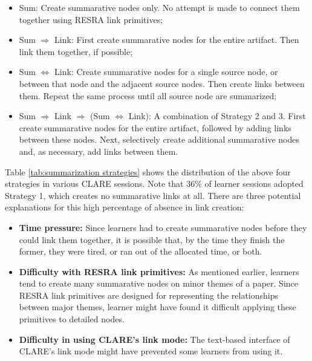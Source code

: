 \begin{itemize}
  \item {\sf Sum:} Create summarative nodes only. No attempt is made to
  connect them together using RESRA link primitives;
  
\item {\sf Sum \({\Rightarrow}\) Link:} First create summarative nodes
  for the entire artifact. Then link them together, if possible;
  
\item {\sf Sum \( \Leftrightarrow \) Link:} Create summarative nodes for
  a single source node, or between that node and the adjacent source
  nodes. Then create links between them. Repeat the same process until
  all source node are summarized;
  
\item {\sf Sum \({\Rightarrow}\) Link \({\Rightarrow}\) (Sum \(
  \Leftrightarrow \) Link):} A combination of Strategy 2 and 3. First
  create summarative nodes for the entire artifact, followed by adding
  links between these nodes. Next, selectively create additional
  summarative nodes and, as necessary, add links between them.

\end{itemize}

Table \ref{tab:summarization strategies} shows the distribution of the
above four strategies in various CLARE sessions. Note that 36\% of learner
sessions adopted Strategy 1, which creates no summarative links at all.
There are three potential explanations for this high percentage of absence
in link creation:

\begin{itemize}
\item {\bf Time pressure:} Since learners had to create summarative nodes
  before they could link them together, it is possible that, by the time
  they finish the former, they were tired, or ran out of the allocated
  time, or both.
  
\item {\bf Difficulty with RESRA link primitives:} As mentioned earlier,
  learners tend to create many summarative nodes on minor themes of a
  paper. Since RESRA link primitives are designed for representing the
  relationships between major themes, learner might have found it difficult
  applying these primitives to detailed nodes.
  
\item {\bf Difficulty in using CLARE's link mode:} The text-based
  interface of CLARE's link mode might have prevented some learners from
  using it.
\end{itemize}

